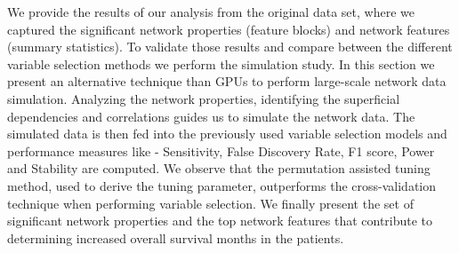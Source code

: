 We provide the results of our analysis from the original data set, where we captured the significant network properties (feature blocks) and network features (summary statistics). To validate those results and compare between the different variable selection methods we perform the simulation study. In this section we present an alternative technique than GPUs to perform large-scale network data simulation. Analyzing the network properties, identifying the superficial dependencies and correlations guides us to simulate the network data. The simulated data is then fed into the previously used variable selection models and performance measures like - Sensitivity, False Discovery Rate, F1 score, Power and Stability are computed. We observe that the permutation assisted tuning method, used to derive the tuning parameter, outperforms the cross-validation technique when performing variable selection. We finally present the set of significant network properties and the top network features that contribute to determining increased overall survival months in the patients.\par

